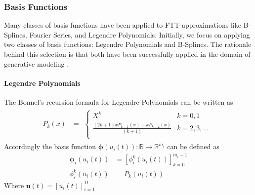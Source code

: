 \documentclass[11pt]{article}
\begin{document}
    \subsubsection*{Basis Functions}
    Many classes of basis functions have been applied to FTT-approximations like B-Splines, Fourier Series,
    \cite{novikov2022tensortrain} and Legendre Polynomials\cite{sommer2024generative}.
    Initially, we focus on applying two classes of basis functions: Legendre Polynomials and B-Splines.
    The rationale behind this selection is that both have been successfully applied in the domain of generative modeling
    \cite{novikov2022tensortrain,sommer2024generative}.

    \paragraph{Legendre Polynomials}
    The Bonnel's recursion formula for Legendre-Polynomials can be written as
    \begin{equation}
        \label{eq:legendre-poly-recursion}
        \begin{aligned}
            P_{k}(x)&=
            \begin{aligned}
                \begin{cases}
                    X^k & k=0,1 \\
                    \frac{(2 k+1)x P_{k-1}(x)-k P_{k-2}(x)}{(k + 1)} & k=2,3,\dots \\
                \end{cases}
            \end{aligned}
        \end{aligned}
    \end{equation}
    Accordingly the basis function $\bm{\phi}(u_i(t)) : \mathbb{R} \rightarrow \mathbb{R}^{m_i}$ can be defined as
    \begin{equation}
        \label{eq:ftt-basis-legendre-polynomials}
        \begin{aligned}
            \bm{\phi}_i(u_i(t))&=[\phi_i^k(u_i(t))]_{k=0}^{m_i-1} \\
            \phi_i^k(u_i(t)) &= P_{k}(u_i(t))
        \end{aligned}
    \end{equation}
    Where $\bm{u}(t)=[u_i(t)]_{i=1}^{D}$
\end{document}
